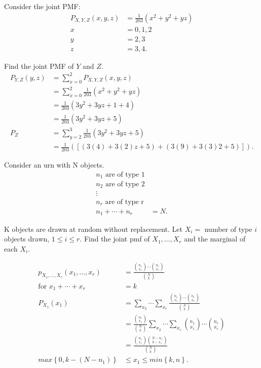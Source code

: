 \begin{example}
	Consider the joint PMF:
	\begin{align*}
		P_{X, Y, Z} \left( x, y, z \right)  &= \frac{1}{203} \left( x ^2 + y ^2 + yz \right)  \\
		x &=  0, 1, 2 \\
		y &= 2,3\\
		z &= 3, 4
	.\end{align*}

	Find the joint PMF of $Y$ and $Z$. 
\begin{align*}
	P_{Y, Z}\left( y, z \right)  &= \sum_{x=0}^{2} P_{X, Y, Z} \left( x, y, z \right)  \\
				     &= \sum_{x=0}^{2} \frac{1}{203} \left( x^2 + y^2 + yz \right) \\ 
				     &= \frac{1}{203} \left( 3y^2 + 3yz + 1 + 4  \right)  \\	
				     &= \frac{1}{203} \left( 3y^2 + 3yz + 5 \right)  \\
	P_{Z} &=  \sum_{y=2}^{3} \frac{1}{203}\left( 3y^2 + 3yz + 5 \right)  \\
	      &= \frac{1}{203} \left( \left[ (3\left( 4 \right)  + 3\left( 2 \right) z + 5 ) 
	      + \left( 3\left( 9 \right)  + 3\left( 3 \right) 2  + 5 \right)\right]  \right)  
.\end{align*}

Consider an urn with N objects.
\begin{align*}
	n_{1} \text{  are of type 1} \\
	n_{2} \text{  are of type 2} \\
	\vdots \\
	n_{r} \text{  are of type r} \\
	n_{1} + \cdots + n _{r} &= N 
.\end{align*}

K objects are drawn at random without replacement. Let $X _{i} =$ number of type $i$ objects drawn, $1 \le i \le r$. 
Find the joint pmf of $X_{1}, \ldots, X_{r}$ and the marginal of each $X _{i}$. 

\begin{align}
	p_{ X_{1} , \ldots , X_{r} } \left( x_{1}, \ldots , x_{r} \right) 
	&= \frac{ \binom{n_{1}}{x_1} \cdots \binom{n_{r}}{x_{r}} }{ \binom{N}{k} } \\
\text{for  } x_{1} + \cdots + x_{r} &= k \\ 
P_{X_{1}}\left( x_1 \right)  &=  \sum_{x_{2}}^{} \cdots \sum_{x_{r}}^{} \frac{ \binom{n_{1}}{x_1} \cdots \binom{n_{r}}{x_{r}}}{\binom{N}{k}} \\
			     &= \frac{\binom{n_{1}}{x_1}}{\binom{N}{k} } \sum_{x_{2}} \cdots \sum_{x_{r}}  \binom{n_{1}}{x_1}  \cdots \binom{n_{r}}{x_r} \\
     &= \frac{\binom{n_{1}}{x_1}\binom{N - n_{1}}{k - x_1}  }{\binom{N}{k} } \\
max \left\{ 0, k - \left( N - n_{1} \right)  \right\} &\le  x_1 \le min\left\{ k, n \right\} 		
.\end{align}
\end{example}

